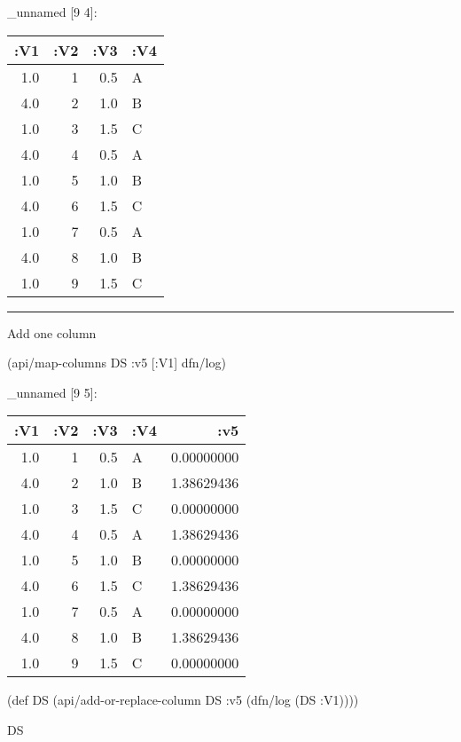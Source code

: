 \documentclass[]{article}
\newenvironment{Shaded}{\begin{snugshade}}{\end{snugshade}}
\newcommand{\FunctionTok}[1]{\textcolor[rgb]{0.00,0.00,0.00}{#1}}
\newcommand{\BuiltInTok}[1]{#1}
\newcommand{\AttributeTok}[1]{\textcolor[rgb]{0.77,0.63,0.00}{#1}}
\newcommand{\NormalTok}[1]{#1}
\begin{document}
\_unnamed {[}9 4{]}:

\begin{longtable}[]{@{}rrrl@{}}
\toprule
:V1 & :V2 & :V3 & :V4\tabularnewline
\midrule
\endhead
1.0 & 1 & 0.5 & A\tabularnewline
4.0 & 2 & 1.0 & B\tabularnewline
1.0 & 3 & 1.5 & C\tabularnewline
4.0 & 4 & 0.5 & A\tabularnewline
1.0 & 5 & 1.0 & B\tabularnewline
4.0 & 6 & 1.5 & C\tabularnewline
1.0 & 7 & 0.5 & A\tabularnewline
4.0 & 8 & 1.0 & B\tabularnewline
1.0 & 9 & 1.5 & C\tabularnewline
\bottomrule
\end{longtable}

\begin{center}\rule{0.5\linewidth}{0.5pt}\end{center}

Add one column

\begin{Shaded}
\begin{Highlighting}[]
\NormalTok{(api/map-columns DS }\AttributeTok{:v5}\NormalTok{ [}\AttributeTok{:V1}\NormalTok{] dfn/log)}
\end{Highlighting}
\end{Shaded}

\_unnamed {[}9 5{]}:

\begin{longtable}[]{@{}rrrlr@{}}
\toprule
:V1 & :V2 & :V3 & :V4 & :v5\tabularnewline
\midrule
\endhead
1.0 & 1 & 0.5 & A & 0.00000000\tabularnewline
4.0 & 2 & 1.0 & B & 1.38629436\tabularnewline
1.0 & 3 & 1.5 & C & 0.00000000\tabularnewline
4.0 & 4 & 0.5 & A & 1.38629436\tabularnewline
1.0 & 5 & 1.0 & B & 0.00000000\tabularnewline
4.0 & 6 & 1.5 & C & 1.38629436\tabularnewline
1.0 & 7 & 0.5 & A & 0.00000000\tabularnewline
4.0 & 8 & 1.0 & B & 1.38629436\tabularnewline
1.0 & 9 & 1.5 & C & 0.00000000\tabularnewline
\bottomrule
\end{longtable}

\begin{Shaded}
\begin{Highlighting}[]
\NormalTok{(}\BuiltInTok{def}\FunctionTok{ DS }\NormalTok{(api/add-or-replace-column DS }\AttributeTok{:v5}\NormalTok{ (dfn/log (DS }\AttributeTok{:V1}\NormalTok{))))}
\end{Highlighting}
\end{Shaded}

\begin{Shaded}
\begin{Highlighting}[]
\NormalTok{DS}
\end{Highlighting}
\end{Shaded}
\end{document}
